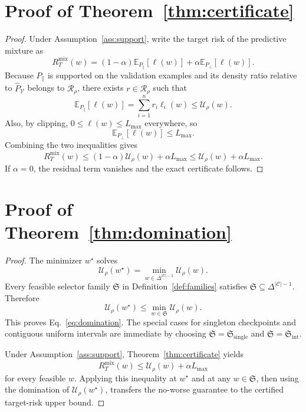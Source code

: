 \documentclass{article}
\newcommand{\EE}{\mathbb{E}}
\newcommand{\cC}{\mathcal{C}}
\newcommand{\cR}{\mathcal{R}}
\newcommand{\cV}{\mathcal{V}}
\newcommand{\simplex}{\Delta}
\begin{document}
\section{Proof of Theorem~\ref{thm:certificate}}

\begin{proof}
Under Assumption~\ref{ass:support}, write the target risk of the predictive mixture as
\[
    R_T^{\mathrm{mix}}(w)
    =
    (1-\alpha)\EE_{P_{\parallel}}[\ell(w)]
    +
    \alpha \EE_{P_{\perp}}[\ell(w)].
\]
Because $P_{\parallel}$ is supported on the validation examples and its density ratio relative to $\widehat P_{\cV}$ belongs to $\cR_{\rho}$, there exists $r\in\cR_{\rho}$ such that
\[
    \EE_{P_{\parallel}}[\ell(w)] = \sum_{i=1}^{n} r_i \ell_i(w) \le \mathcal U_{\rho}(w).
\]
Also, by clipping, $0\le \ell(w)\le L_{\max}$ everywhere, so
\[
    \EE_{P_{\perp}}[\ell(w)] \le L_{\max}.
\]
Combining the two inequalities gives
\[
    R_T^{\mathrm{mix}}(w)
    \le
    (1-\alpha)\mathcal U_{\rho}(w) + \alpha L_{\max}
    \le
    \mathcal U_{\rho}(w) + \alpha L_{\max}.
\]
If $\alpha=0$, the residual term vanishes and the exact certificate follows.
\end{proof}

\section{Proof of Theorem~\ref{thm:domination}}

\begin{proof}
The minimizer $w^{\star}$ solves
\[
    \mathcal U_{\rho}(w^{\star})
    =
    \min_{w\in\simplex^{|\cC|-1}} \mathcal U_{\rho}(w).
\]
Every feasible selector family $\mathfrak S$ in Definition~\ref{def:families} satisfies $\mathfrak S\subseteq \simplex^{|\cC|-1}$. Therefore
\[
    \mathcal U_{\rho}(w^{\star})
    \le
    \min_{w\in\mathfrak S}\mathcal U_{\rho}(w).
\]
This proves Eq.~\eqref{eq:domination}. The special cases for singleton checkpoints and contiguous uniform intervals are immediate by choosing $\mathfrak S=\mathfrak S_{\mathrm{single}}$ and $\mathfrak S=\mathfrak S_{\mathrm{int}}$.

Under Assumption~\ref{ass:support}, Theorem~\ref{thm:certificate} yields
\[
    R_T^{\mathrm{mix}}(w)
    \le
    \mathcal U_{\rho}(w) + \alpha L_{\max}
\]
for every feasible $w$. Applying this inequality at $w^{\star}$ and at any $w\in\mathfrak S$, then using the domination of $\mathcal U_{\rho}(w^{\star})$, transfers the no-worse guarantee to the certified target-risk upper bound.
\end{proof}
\end{document}
